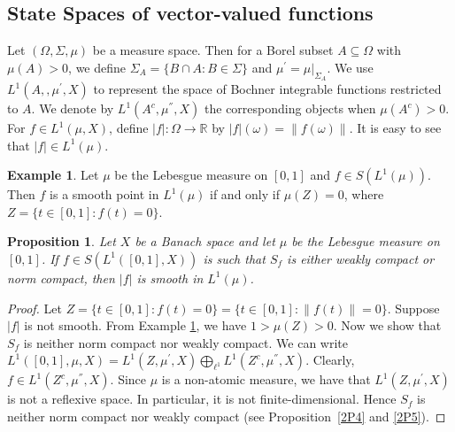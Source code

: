 \documentclass[12pt]{amsart}
\newtheorem{proposition}[theorem]{Proposition}
\theoremstyle{definition}
\newtheorem{example}[theorem]{Example}
\numberwithin{equation}{section}
\begin{document}
\subsection{State Spaces of vector-valued functions}\label{Sec32}
 Let $(\Omega,\Sigma,\mu)$ be a measure space. Then for a Borel subset $A\subseteq\Omega$ with $\mu(A)>0$, we define $\Sigma_{A}=\{B\cap A:B\in \Sigma\}$ and $\mu^{'}=\mu|_{{\Sigma}_{A}}$. We use $L^{1}(A,,\mu^{'},X)$ to represent the space of Bochner integrable functions restricted to $A$. We denote by $L^{1}(A^{c},\mu^{''},X)$ the corresponding objects when $\mu(A^{c})>0$. For $f\in L^{1}(\mu,X)$, define $|f|:\Omega\to \mathbb{R}$ by $|f|(\omega)=\|f(\omega)\|$. It is easy to see that $|f|\in L^1(\mu)$.
 \begin{example}\cite[p.~170]{Ho}\label{52}
   Let $\mu$ be the Lebesgue measure on $[0,1]$ and $f\in S(L^1(\mu))$. Then $f$ is a smooth point in $L^1(\mu)$ if and only if $\mu(Z)=0$, where $Z=\{t\in [0,1]: f(t)=0\}$.
 \end{example}
\begin{proposition}\label{th39}
    Let $X$ be a Banach space and let $\mu$ be the Lebesgue measure on $[0,1]$. If $f\in S(L^1([0,1],X))$ is such that $S_f$ is either weakly compact or norm compact, then $|f|$ is smooth in $L^1(\mu)$.
\end{proposition}
\begin{proof}
    Let $Z=\{t\in [0,1]: f(t)=0 \}=\{t\in [0,1]: \|f(t)\|=0 \}$. Suppose $|f| $ is not smooth. From Example \ref{52}, we have $1>\mu(Z)>0$. Now we show that $S_{f}$ is neither norm compact nor weakly compact. We can write $L^1([0,1],\mu,X)=L^1(Z,\mu^{'},X)\bigoplus_{\ell^1} L^1(Z^{c},\mu^{''},X)$. Clearly, $f\in L^1(Z^{c},\mu^{''},X)$. Since $\mu$ is a non-atomic measure, we have that $L^1(Z,\mu^{'},X)$ is not a reflexive space. In particular, it is not finite-dimensional. Hence $S_{f}$ is neither norm compact nor weakly compact (see Proposition~\ref{2P4} and \ref{2P5}).  
\end{proof}
\end{document}
